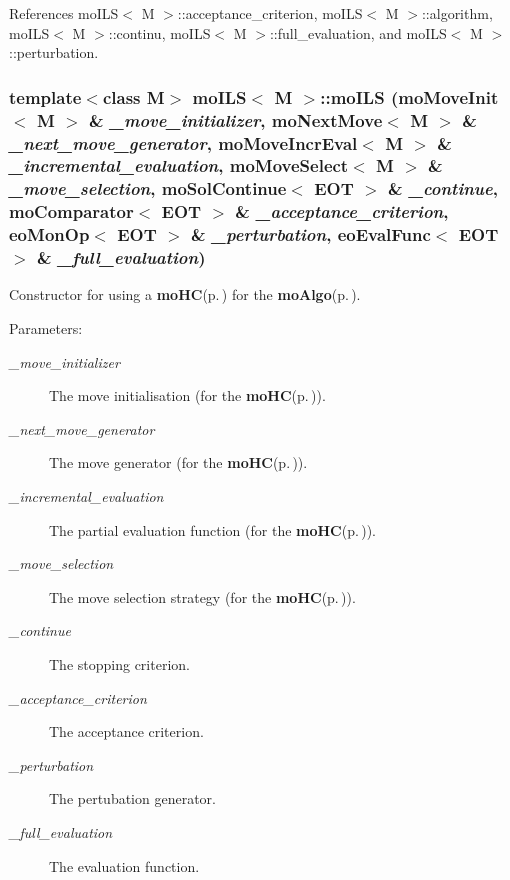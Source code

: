 References mo\-ILS$<$ M $>$::acceptance\_\-criterion, mo\-ILS$<$ M $>$::algorithm, mo\-ILS$<$ M $>$::continu, mo\-ILS$<$ M $>$::full\_\-evaluation, and mo\-ILS$<$ M $>$::perturbation.
\subsubsection{\setlength{\rightskip}{0pt plus 5cm}template$<$class M$>$ {\bf mo\-ILS}$<$ M $>$::{\bf mo\-ILS} ({\bf mo\-Move\-Init}$<$ M $>$ \& {\em \_\-move\_\-initializer}, {\bf mo\-Next\-Move}$<$ M $>$ \& {\em \_\-next\_\-move\_\-generator}, {\bf mo\-Move\-Incr\-Eval}$<$ M $>$ \& {\em \_\-incremental\_\-evaluation}, {\bf mo\-Move\-Select}$<$ M $>$ \& {\em \_\-move\_\-selection}, {\bf mo\-Sol\-Continue}$<$ {\bf EOT} $>$ \& {\em \_\-continue}, {\bf mo\-Comparator}$<$ {\bf EOT} $>$ \& {\em \_\-acceptance\_\-criterion}, {\bf eo\-Mon\-Op}$<$ {\bf EOT} $>$ \& {\em \_\-perturbation}, {\bf eo\-Eval\-Func}$<$ {\bf EOT} $>$ \& {\em \_\-full\_\-evaluation})\hspace{0.3cm}{\tt  [inline]}}\label{classmo_i_l_s_a1}


Constructor for using a {\bf mo\-HC}{\rm (p.\,\pageref{classmo_h_c})} for the {\bf mo\-Algo}{\rm (p.\,\pageref{classmo_algo})}. 

\begin{Desc}
\item[Parameters:]
\begin{description}
\item[{\em \_\-move\_\-initializer}]The move initialisation (for the {\bf mo\-HC}{\rm (p.\,\pageref{classmo_h_c})}). \item[{\em \_\-next\_\-move\_\-generator}]The move generator (for the {\bf mo\-HC}{\rm (p.\,\pageref{classmo_h_c})}). \item[{\em \_\-incremental\_\-evaluation}]The partial evaluation function (for the {\bf mo\-HC}{\rm (p.\,\pageref{classmo_h_c})}). \item[{\em \_\-move\_\-selection}]The move selection strategy (for the {\bf mo\-HC}{\rm (p.\,\pageref{classmo_h_c})}). \item[{\em \_\-continue}]The stopping criterion. \item[{\em \_\-acceptance\_\-criterion}]The acceptance criterion. \item[{\em \_\-perturbation}]The pertubation generator. \item[{\em \_\-full\_\-evaluation}]The evaluation function. \end{description}
\end{Desc}


